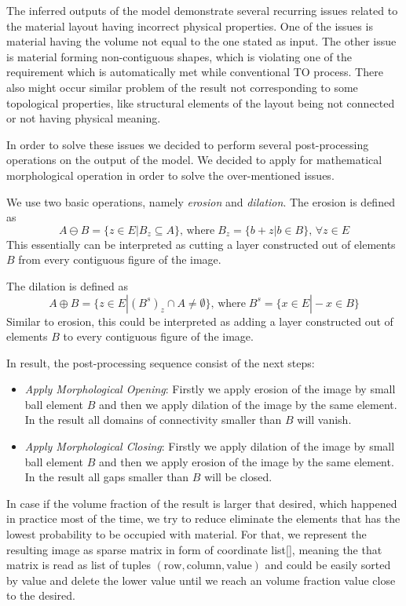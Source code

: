 The inferred outputs of the model demonstrate several recurring issues related to the material layout having incorrect physical properties.
One of the issues is material having the volume not equal to the one stated as input.
The other issue is material forming non-contiguous shapes, which is violating one of the requirement which is automatically met while conventional TO process.
There also might occur similar problem of the result not corresponding to some topological properties, like structural elements of the layout being not connected or not having physical meaning.
\medskip

In order to solve these issues we decided to perform several post-processing operations on the output of the model.
We decided to apply for mathematical morphological operation in order to solve the over-mentioned issues.
\medskip

We use two basic operations, namely \textit{erosion} and \textit{dilation}.
The erosion is defined as 
\begin{equation}
A \ominus B = \{z \in E | B_{z} \subseteq A \}, \, \mathrm{where} \; B_{z}=\{ b+z | b \in B \}, \, \forall z \in E 
\end{equation} 
This essentially can be interpreted as cutting a layer constructed out of elements $B$ from every contiguous figure of the image.

The dilation is defined as 
\begin{equation}
A \oplus B = \{z \in E | (B^{s})_{z} \cap  A \neq \emptyset \}, \, \mathrm{where} \; B^{s}=\{x \in E | -x \in B \}
\end{equation} 
Similar to erosion, this could be interpreted as adding a layer constructed out of elements $B$ to every contiguous figure of the image. 
\medskip

In result, the post-processing sequence consist of the next steps:
\begin{itemize}
	\item \textit{Apply Morphological Opening}: Firstly we apply erosion of the image by small ball element $B$ and then we apply dilation of the image by the same element. In the result all domains of connectivity smaller than $B$ will vanish.
	\item \textit{Apply Morphological Closing}: Firstly we apply dilation of the image by small ball element $B$ and then we apply erosion of the image by the same element. In the result all gaps smaller than $B$ will be closed.
\end{itemize}

In case if the volume fraction of the result is larger that desired, which happened in practice most of the time, we try to reduce eliminate the elements that has the lowest probability to be occupied with material.
For that, we represent the resulting image as sparse matrix in form of coordinate list\ref{}, meaning the that matrix is read as list of tuples $(\mathrm{row},\mathrm{column},\mathrm{value})$ and could be easily sorted by value and delete the lower value until we reach an volume fraction value close to the desired.



 
